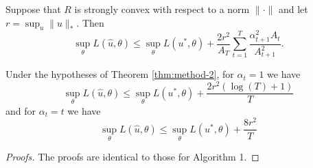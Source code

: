 \documentclass[paper.tex]{subfiles}
\begin{document}
\begin{theorem}
\label{thm:method-2}
Suppose that $R$ is strongly convex with respect to a norm $\|\cdot\|$ 
and let $r = \sup_{u} \|u\|_{*}$. Then 
\[ \sup_{\theta} L(\hat{u}, \theta) \leq \sup_{\theta} L(u^*, \theta) + \frac{2r^2}{A_T} \sum_{t=1}^T \frac{\alpha_{t+1}^2A_t}{A_{t+1}^2}. \]
\end{theorem}
\begin{corollary}
\label{cor:method-2}
Under the hypotheses of Theorem \ref{thm:method-2}, for $\alpha_t = 1$ we have
\[ \sup_{\theta} L(\hat{u}, \theta) \leq \sup_{\theta} L(u^*, \theta) + \frac{2r^2(\log(T) + 1)}{T} \]
and for $\alpha_t = t$ we have
\[ \sup_{\theta} L(\hat{u}, \theta) \leq \sup_{\theta} L(u^*, \theta) + \frac{8r^2}{T} \]
\end{corollary}
\begin{proof}[Proofs]
The proofs are identical to those for Algorithm 1.
\end{proof}
\end{document}
